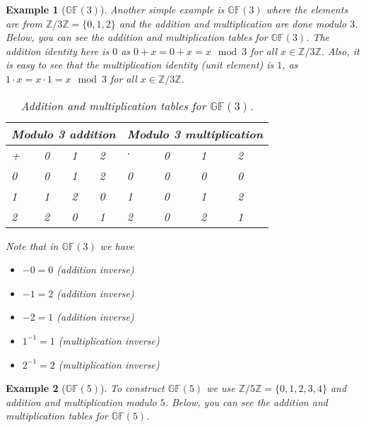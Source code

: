 \documentclass[12pt]{article}
\newtheorem{example}{Example}
\newcommand{\Zn}[1]{\mathds{Z}/#1\mathds{Z}}
\newcommand{\gf}[1]{\mathds{GF}\left(#1\right)} %
\begin{document}
\begin{example}[$\gf{3}$]
	Another simple example is $\gf{3}$ where the elements are from $\Zn{3}= \{0,1,2\}$ and the addition and multiplication are done modulo $3$.\\
	
	Below, you can see the addition and multiplication tables for $\gf{3}$. The addition identity here is $0$ as $0+x = 0 + x = x \mod 3$ for all $x\in\Zn{3}$. Also, it is easy to see that the multiplication identity (unit element) is $1$, as $1 \cdot x = x \cdot 1 = x \mod 3$ for all $x\in\Zn{3}$. \\
	
	\begin{table}[h!]
		\centering
		\begin{tabular}{|m{2em}|m{2em}|m{2em}|m{2em}||m{2em}|m{2em}|m{2em}|m{2em}|}
			 
			\multicolumn{4}{c||}{Modulo 3 addition} &   \multicolumn{4}{c}{Modulo 3 multiplication}    \\  [0.5ex]
			\hline\hline 
			+ & 0 & 1 & 2 & $\cdot$ & 0 & 1 & 2\\ 
			\hline 
			0 & 0 & 1 & 2 & 0 & 0 & 0 & 0\\ 
			\hline 
			1 & 1 & 2 & 0 &   1 & 0 & 1 & 2\\ 
			\hline 
			2 & 2 & 0 & 1 &  2 & 0 & 2 & 1\\
			\hline
		\end{tabular} 
		\caption{Addition and multiplication tables for $\gf{3}$.}
	\end{table}
	
	
	
	
	Note that in $\gf{3}$ we have
	\begin{itemize}
		\item  $-0 = 0$ \qquad (addition inverse)
		\item  $-1 = 2$ \qquad (addition inverse)
		\item  $-2 = 1$ \qquad (addition inverse)
		\item $1^{-1} = 1$ \qquad (multiplication inverse)
		\item $2^{-1} = 2$ \qquad (multiplication inverse)
	\end{itemize}
	
	
	
	
	
\end{example}


\begin{example}[$\gf{5}$]
	To construct $\gf{5}$ we use $\Zn{5}=\{0,1,2,3,4\}$ and addition and multiplication modulo $5$. Below, you can see the addition and multiplication tables for $\gf{5}$.
\end{example}
\end{document}
